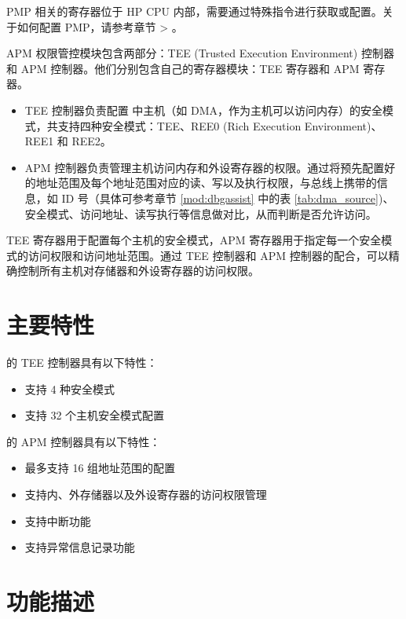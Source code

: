 \documentclass[main\_\_CN.tex]{subfiles}
\begin{document}
PMP 相关的寄存器位于 HP CPU 内部，需要通过特殊指令进行获取或配置。关于如何配置 PMP，请参考章节 \textit{} > \textit{}。


APM 权限管控模块包含两部分：TEE (Trusted Execution Environment) 控制器和 APM 控制器。他们分别包含自己的寄存器模块：TEE 寄存器和 APM 寄存器。


\begin{itemize}
    \item TEE 控制器负责配置 \chipname{} 中主机（如 DMA，作为主机可以访问内存）的安全模式，共支持四种安全模式：TEE、REE0 (Rich Execution Environment)、REE1 和 REE2。
    \item APM 控制器负责管理主机访问内存和外设寄存器的权限。通过将预先配置好的地址范围及每个地址范围对应的读、写以及执行权限，与总线上携带的信息，如 ID 号（具体可参考章节 \ref{mod:dbgassist} \textit{} 中的表 \ref{tab:dma_source})、安全模式、访问地址、读写执行等信息做对比，从而判断是否允许访问。
\end{itemize}

TEE 寄存器用于配置每个主机的安全模式，APM 寄存器用于指定每一个安全模式的访问权限和访问地址范围。通过 TEE 控制器和 APM 控制器的配合，可以精确控制所有主机对存储器和外设寄存器的访问权限。


 
\section{主要特性}

\chipname{} 的 TEE 控制器具有以下特性：

\begin{itemize}
    \item 支持 4 种安全模式
    \item 支持 32 个主机安全模式配置

\end{itemize}
    
\chipname{} 的 APM 控制器具有以下特性：

\begin{itemize}
    \item 最多支持 16 组地址范围的配置
    \item 支持内、外存储器以及外设寄存器的访问权限管理
    \item 支持中断功能
    \item 支持异常信息记录功能
\end{itemize}

\section{功能描述}
\end{document}
